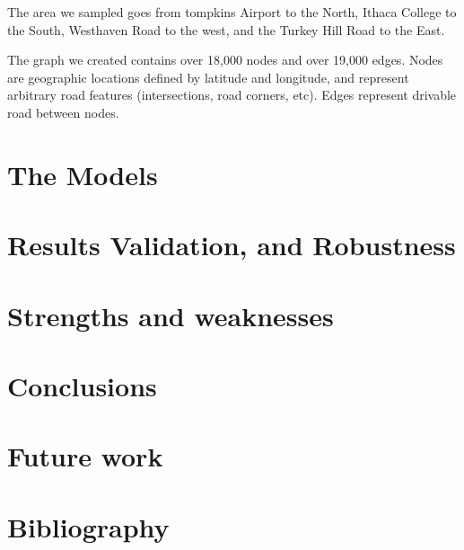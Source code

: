 \documentclass{article}
\begin{document}
The area we sampled goes from tompkins Airport to the North, Ithaca College to the South, Westhaven Road to the west, and the Turkey Hill Road to the East.

The graph we created contains over 18,000 nodes and over 19,000 edges. Nodes are geographic locations defined by latitude and longitude, and represent arbitrary road features (intersections, road corners, etc). Edges represent drivable road between nodes.
\section{The Models}

\section{Results Validation, and Robustness}

\section{Strengths and weaknesses}

\section{Conclusions}

\section{Future work}

\section{Bibliography}
\end{document}
